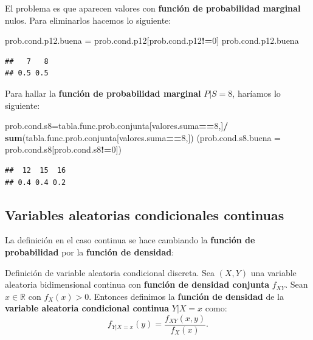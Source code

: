 \documentclass[]{book}
\newenvironment{Shaded}{\begin{snugshade}}{\end{snugshade}}
\newcommand{\DataTypeTok}[1]{\textcolor[rgb]{0.13,0.29,0.53}{#1}}
\newcommand{\DecValTok}[1]{\textcolor[rgb]{0.00,0.00,0.81}{#1}}
\newcommand{\KeywordTok}[1]{\textcolor[rgb]{0.13,0.29,0.53}{\textbf{#1}}}
\newcommand{\NormalTok}[1]{#1}
\newcommand{\OperatorTok}[1]{\textcolor[rgb]{0.81,0.36,0.00}{\textbf{#1}}}
\newcommand{\StringTok}[1]{\textcolor[rgb]{0.31,0.60,0.02}{#1}}
\begin{document}
El problema es que aparecen valores con \textbf{función de probabilidad marginal} nulos. Para eliminarlos hacemos lo siguiente:

\begin{Shaded}
\begin{Highlighting}[]
\NormalTok{prob.cond.p12.buena =}\StringTok{ }\NormalTok{prob.cond.p12[prob.cond.p12}\OperatorTok{!=}\DecValTok{0}\NormalTok{]}
\NormalTok{prob.cond.p12.buena}
\end{Highlighting}
\end{Shaded}

\begin{verbatim}
##   7   8 
## 0.5 0.5
\end{verbatim}

Para hallar la \textbf{función de probabilidad marginal} \(P|S=8\), haríamos lo siguiente:

\begin{Shaded}
\begin{Highlighting}[]
\NormalTok{prob.cond.s8=tabla.func.prob.conjunta[valores.suma}\OperatorTok{==}\DecValTok{8}\NormalTok{,]}\OperatorTok{/}
\StringTok{  }\KeywordTok{sum}\NormalTok{(tabla.func.prob.conjunta[valores.suma}\OperatorTok{==}\DecValTok{8}\NormalTok{,])}
\NormalTok{(}\DataTypeTok{prob.cond.s8.buena =}\NormalTok{ prob.cond.s8[prob.cond.s8}\OperatorTok{!=}\DecValTok{0}\NormalTok{])}
\end{Highlighting}
\end{Shaded}

\begin{verbatim}
##  12  15  16 
## 0.4 0.4 0.2
\end{verbatim}

\hypertarget{variables-aleatorias-condicionales-continuas}{%
\subsection{Variables aleatorias condicionales continuas}\label{variables-aleatorias-condicionales-continuas}}

La definición en el caso continua se hace cambiando la \textbf{función de probabilidad} por la \textbf{función de densidad}:

Definición de variable aleatoria condicional discreta.
Sea \((X,Y)\) una variable aleatoria bidimensional continua con \textbf{función de densidad conjunta} \(f_{XY}\). Sean \(x\in\mathbb{R}\) con \(f_X(x)>0\). Entonces definimos la \textbf{función de densidad} de la \textbf{variable aleatoria condicional continua} \(Y|X=x\) como:
\[
f_{Y|X=x}(y)=\frac{f_{XY}(x,y)}{f_X(x)}.
\]
\end{document}
